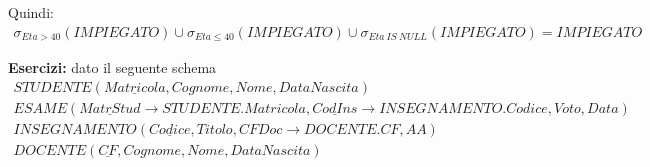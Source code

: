 \documentclass{article}
\begin{document}
Quindi: \begin{align*}
    \sigma_{Eta >40} (IMPIEGATO) \cup \sigma_{Eta \leq 40} (IMPIEGATO) \cup \sigma_{Eta\ IS\ NULL} (IMPIEGATO) = IMPIEGATO
\end{align*}


\textbf{Esercizi:}
dato il seguente schema
\begin{align*}
    STUDENTE(\underline{Matricola}, Cognome, Nome, DataNascita) \\
    ESAME(\underline{MatrStud} \to STUDENTE.Matricola,\underline{CodIns} \to INSEGNAMENTO.Codice, Voto, Data) \\
    INSEGNAMENTO(\underline{Codice},Titolo, CFDoc \to DOCENTE.CF, AA)\\
    DOCENTE(\underline{CF}, Cognome, Nome, DataNascita) \\
\end{align*}
\end{document}
